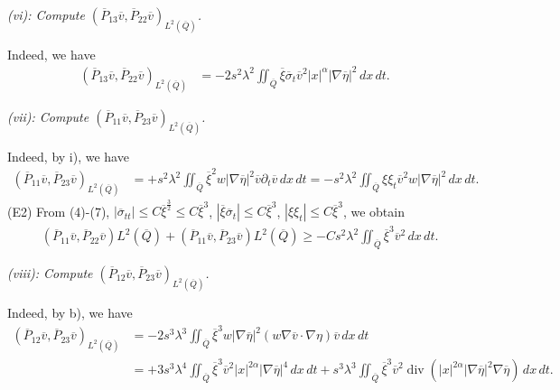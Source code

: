 \documentclass[11pt]{article}
\numberwithin{equation}{section}
\DeclareMathOperator{\Div}{div}
\begin{document}
{\it (vi): Compute $(\overline{P}_{13}\overline{v}, \overline{P}_{22}\overline{v})_{L^2(\overline{Q})}$.}

Indeed, we have
\begin{equation*}
	\begin{split}
		(\overline{P}_{13}\overline{v}, \overline{P}_{22}\overline{v})_{L^2(\overline{Q})}
		&=-2s^2\lambda^2\iint_{\overline{Q}}\overline{\xi} \overline{\sigma}_t\overline{v}^2|x|^\alpha |\nabla \overline{\eta}|^2\,dx\,dt.
	\end{split}
\end{equation*}

{\it (vii): Compute $(\overline{P}_{11}\overline{v}, \overline{P}_{23}\overline{v})_{L^2(\overline{Q})}$.}

Indeed, by i),  we have
\begin{equation*}
	\begin{split}
		(\overline{P}_{11}\overline{v}, \overline{P}_{23}\overline{v})_{L^2(\overline{Q})}
		&=+s^2\lambda^2\iint_{\overline{Q}}\overline{\xi}^2 w|\nabla \overline{\eta}|^2 \overline{v}\partial_t\overline{v}\,dx\,dt=-s^2\lambda^2\iint_{\overline{Q}}\xi\xi_t\overline{v}^2w|\nabla\overline{\eta}|^2\,dx\,dt.
	\end{split}
\end{equation*}
(E2) From (4)-(7), $|\overline{\sigma}_{tt}|\leq C\overline{\xi}^{\frac{3}{2}}\leq C\overline{\xi}^3$, $|\overline{\xi}\overline{\sigma}_t|\leq C\overline{\xi}^3$, $|\xi\xi_t|\leq C\overline{\xi}^3$, we obtain
\begin{equation}\label{12.24.3}
	\begin{split}
		&(\overline{P}_{11}\overline{v},\overline{P}_{22}\overline{v}){L^2(\overline{Q})}+(\overline{P}_{11}\overline{v}, \overline{P}_{23}\overline{v}){L^2(\overline{Q})} \geq
		-Cs^2\lambda^2\iint_{\overline{Q}}\overline{\xi}^3 \overline{v}^2\,dx\,dt.
	\end{split}
\end{equation}

{\it (viii):  Compute $(\overline{P}_{12}\overline{v}, \overline{P}_{23}\overline{v})_{L^2(\overline{Q})}$.}

Indeed, by b), we have
\begin{equation*}
	\begin{split}
		(\overline{P}_{12}\overline{v}, \overline{P}_{23}\overline{v})_{L^2(\overline{Q})}
		&=-2s^3\lambda^3\iint_{\overline{Q}}\overline{\xi}^3 w|\nabla \overline{\eta}|^2 (w\nabla \overline{v}\cdot \nabla \eta)\overline{v}\,dx\,dt\\
		&=+3s^3\lambda^4\iint_{\overline{Q}}\overline{\xi}^3\overline{v}^2|x|^{2\alpha}|\nabla \overline{\eta}|^4\,dx\,dt+s^3\lambda^3\iint_{\overline{Q}}\overline{\xi}^3\overline{v}^2\Div(|x|^{2\alpha}|\nabla \overline{\eta}|^2\nabla \overline{\eta})\,dx\,dt.
	\end{split}
\end{equation*}
\end{document}

